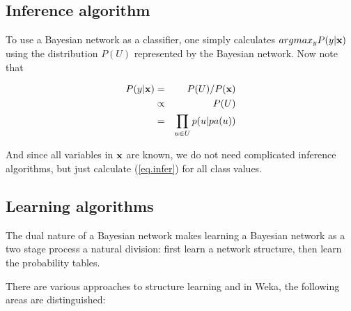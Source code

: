 \documentclass{article}
\begin{document}
\subsection*{Inference algorithm}

To use a Bayesian network as a classifier, one simply calculates $argmax_yP(y|{\bf x})$
using the distribution $P(U)$ represented by the Bayesian network. 
Now note that

\begin{eqnarray}
P(y|{\bf x})&=&P(U)/P({\bf x})\nonumber\\
&\propto& P(U)\nonumber\\
&=&\prod_{u\in U}p(u|pa(u))\label{eq.infer}%
\end{eqnarray}

And since all variables in ${\bf x}$ are known, we do not need complicated inference
algorithms, but just calculate (\ref{eq.infer}) for all class values.

\subsection*{Learning algorithms}

The dual nature of a Bayesian network makes learning a Bayesian
network as a two stage process a natural division: first learn a
network structure, then learn the probability tables.

There are various approaches to structure learning and in Weka, the
following areas are distinguished:
\end{document}
